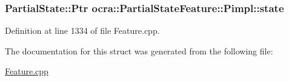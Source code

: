 \subsubsection[{\texorpdfstring{state}{state}}]{\setlength{\rightskip}{0pt plus 5cm}Partial\+State\+::\+Ptr ocra\+::\+Partial\+State\+Feature\+::\+Pimpl\+::state}\hypertarget{structocra_1_1PartialStateFeature_1_1Pimpl_a780cc4ecc5de8f231684ffdd394aa31a}{}\label{structocra_1_1PartialStateFeature_1_1Pimpl_a780cc4ecc5de8f231684ffdd394aa31a}


Definition at line 1334 of file Feature.\+cpp.



The documentation for this struct was generated from the following file\+:\begin{DoxyCompactItemize}
\item 
\hyperlink{Feature_8cpp}{Feature.\+cpp}\end{DoxyCompactItemize}
